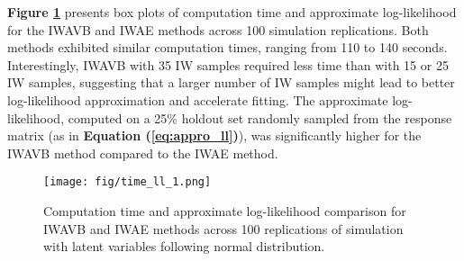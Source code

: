 \documentclass[a4paper,12pt]{article}
\theoremstyle{plain} %
\theoremstyle{remark} %
\theoremstyle{definition} %
\begin{document}

\textbf{Figure \ref{fig:time_ll_1}} presents box plots of computation time and approximate log-likelihood for the IWAVB and IWAE methods across 100 simulation replications. Both methods exhibited similar computation times, ranging from 110 to 140 seconds. Interestingly, IWAVB with 35 IW samples required less time than with 15 or 25 IW samples, suggesting that a larger number of IW samples might lead to better log-likelihood approximation and accelerate fitting. The approximate log-likelihood, computed on a 25\% holdout set randomly sampled from the response matrix (as in \textbf{Equation (\ref{eq:appro_ll})}), was significantly higher for the IWAVB method compared to the IWAE method.
\begin{figure}[htb]
\centering
\texttt{[image: fig/time\_ll\_1.png]}
\caption{Computation time and approximate log-likelihood comparison for IWAVB and IWAE methods across 100 replications of simulation with latent variables following normal distribution.}
\label{fig:time_ll_1}
\end{figure}
\end{document}
